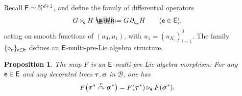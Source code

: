 \documentclass[10pt, reqno]{amsart}
\makeatletter
\numberwithin{subsection}{section}
\numberwithin{subsubsection}{subsection}
\numberwithin{equation}{section} %
\theoremstyle{mystyle}
\newtheorem{prop}[thm]{\hspace{-0.13cm} {Proposition}}%
\theoremstyle{mystyle2}
\theoremstyle{mystyle3}
\newcommand{\bstau}{\boldsymbol{\tau}}
\newcommand{\bssigma}{\boldsymbol{\sigma}}
\newcommand{\grafting}{\overset{\sf e}{\curvearrowright}}
\newcommand\bbN{\mathbb{N}}
\newcommand{\mcB}{\mathcal{B}}
\newcommand*{\defeq}{\mathrel{\rlap{%
                     \raisebox{0.3ex}{$\m@th\cdot$}}%
                     \raisebox{-0.3ex}{$\m@th\cdot$}}%
                     =}
\makeatother
\begin{document}
\medskip

Recall ${\sf E}\simeq \bbN^{d+1}$, and define the family of differential operators
$$
G\triangleright_{\sf e} H \defeq  G\,\partial_{u_{\sf e}}H \qquad ({\sf e}\in{\sf E}),
$$
acting on smooth functions of $(u_0,u_1)$, with $u_1=(u_{X_i})_{i=1}^d$. The family $\{\triangleright_{\sf e}\}_{{\sf e}\in{\sf E}}$ defines an $\sf E$-multi-pre-Lie algebra structure. 

\medskip

\begin{prop}   \label{PropPreLieMorphism}
The map $F$ is an ${\sf E}$-multi-pre-Lie algebra morphism: For any ${\sf e}\in{\sf E}$ and any decorated trees $\bstau, \bssigma$ in $\mcB$, one has
\begin{equation}   \label{EqCharacterizationGrafting*}
F\big(\bstau^*\grafting\bssigma^*\big) = F(\bstau^*)\triangleright_{\sf 
e} F(\bssigma^*).
\end{equation}
\end{prop}

\medskip
\end{document}
